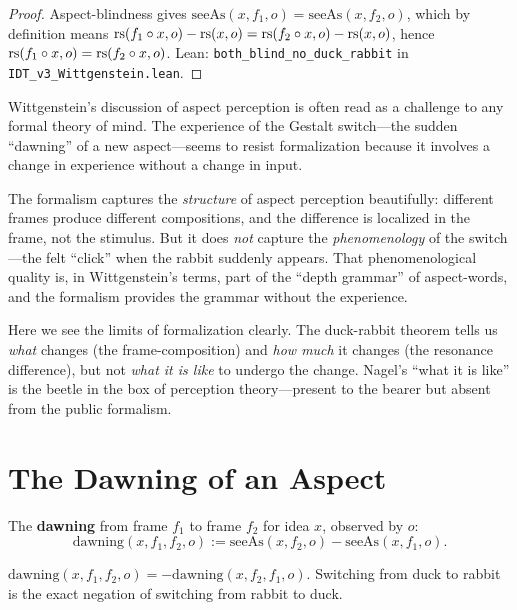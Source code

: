 \begin{proof}
Aspect-blindness gives $\mathrm{seeAs}(x, f_1, o) = \mathrm{seeAs}(x, f_2, o)$,
which by definition means $\mathrm{rs}(f_1 \circ x, o) - \mathrm{rs}(x, o) =
\mathrm{rs}(f_2 \circ x, o) - \mathrm{rs}(x, o)$, hence
$\mathrm{rs}(f_1 \circ x, o) = \mathrm{rs}(f_2 \circ x, o)$.
Lean: \texttt{both\_blind\_no\_duck\_rabbit} in \texttt{IDT\_v3\_Wittgenstein.lean}.
\end{proof}

\begin{interpretation}
\label{interp:aspect-perception}
Wittgenstein's discussion of aspect perception is often read as a challenge
to any formal theory of mind. The experience of the Gestalt switch---the
sudden ``dawning'' of a new aspect---seems to resist formalization because
it involves a change in experience without a change in input.

The formalism captures the \emph{structure} of aspect perception beautifully:
different frames produce different compositions, and the difference is
localized in the frame, not the stimulus. But it does \emph{not} capture the
\emph{phenomenology} of the switch---the felt ``click'' when the rabbit
suddenly appears. That phenomenological quality is, in Wittgenstein's terms,
part of the ``depth grammar'' of aspect-words, and the formalism provides
the grammar without the experience.

Here we see the limits of formalization clearly. The duck-rabbit theorem tells
us \emph{what} changes (the frame-composition) and \emph{how much} it changes
(the resonance difference), but not \emph{what it is like} to undergo the
change. Nagel's ``what it is like'' is the beetle in the box of perception
theory---present to the bearer but absent from the public formalism.
\end{interpretation}

\section{The Dawning of an Aspect}

\begin{definition}
\label{def:dawning}
The \textbf{dawning} from frame $f_1$ to frame $f_2$ for idea $x$,
observed by $o$:
\[
\mathrm{dawning}(x, f_1, f_2, o) :=
\mathrm{seeAs}(x, f_2, o) - \mathrm{seeAs}(x, f_1, o).
\]
\end{definition}

\begin{theorem}
\label{thm:dawning-antisymm}
$\mathrm{dawning}(x, f_1, f_2, o) = -\mathrm{dawning}(x, f_2, f_1, o)$.
Switching from duck to rabbit is the exact negation of switching from rabbit
to duck.
\end{theorem}


